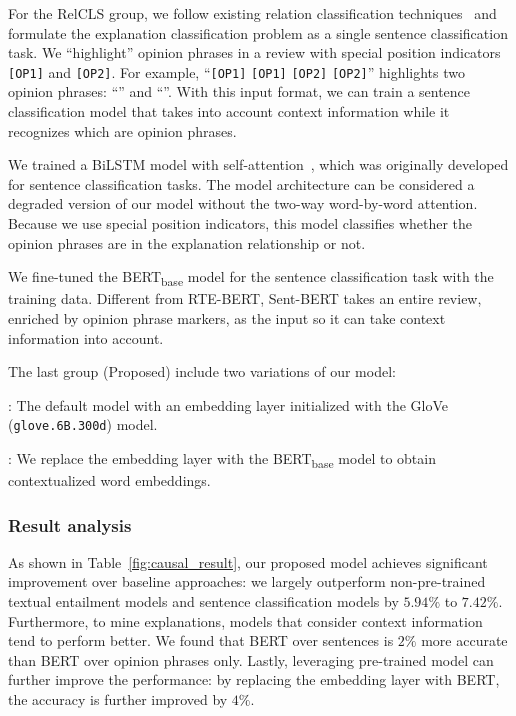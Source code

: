 \smallskip

For the {\sc RelCLS} group, we follow existing relation classification techniques~\cite{zhou2016attention, lin2016neural, wu2019enriching} and formulate the explanation classification problem as a single sentence classification task. We ``highlight'' opinion phrases in a review with special position indicators~\cite{zhou2016attention} {\tt [OP1]} and {\tt [OP2]}. For example, 
``{\tt [OP1]}  {\tt [OP1]}  {\tt [OP2]}  {\tt [OP2]}'' highlights two opinion phrases: ``'' and ``''. With this input format, we can train a sentence classification model that takes into account context information while it recognizes which are opinion phrases. 

 We trained a BiLSTM model with self-attention~\cite{Lin:2017:SelfAttentionLSTM}, which was originally developed for sentence classification tasks. The model architecture can be considered a degraded version of our model without the two-way word-by-word attention. Because we use special position indicators, this model classifies whether the opinion phrases are in the explanation relationship or not. 

 We fine-tuned the BERT\textsubscript{base} model for the sentence classification task with the training data. Different from RTE-BERT, Sent-BERT takes an entire review, enriched by opinion phrase markers, as the input so it can take context information into account. 

\smallskip

The last group ({\sc Proposed}) include two variations of our model:

: The default model with an embedding layer initialized with the GloVe ({\tt glove.6B.300d}) model.

: We replace the embedding layer with the BERT\textsubscript{base} model to obtain contextualized word embeddings. 

\subsubsection{Result analysis}
As shown in Table~\ref{fig:causal_result},
our proposed model achieves significant improvement over baseline approaches: we largely outperform non-pre-trained textual entailment models and sentence classification models by $5.94\%$ to $7.42\%$. Furthermore, to mine explanations, models that consider context information tend to perform better. We found that BERT over sentences is $2\%$ more accurate than BERT over opinion phrases only. Lastly, leveraging pre-trained model can further improve the performance: by replacing the embedding layer with BERT, the accuracy is further improved by $4\%$. 


